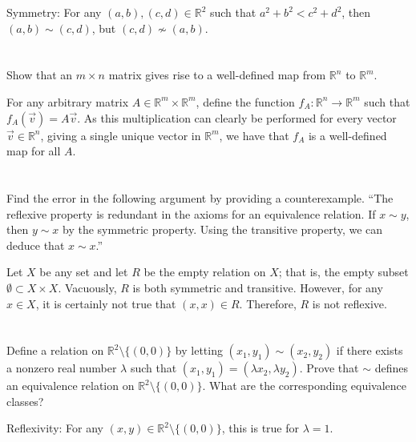 \smallskip

Symmetry: For any $(a, b), (c, d) \in \mathbb{R}^2$ such that $a^2 + b^2 < c^2 + d^2$, then $(a, b) \sim (c, d)$, but $(c, d) \nsim (a, b)$.

\section{}\label{sec:1-27}

Show that an $m \times n$ matrix gives rise to a well-defined map from $\mathbb{R}^n$ to $\mathbb{R}^m$.
\hr

For any arbitrary matrix $A \in \mathbb{R}^m \times \mathbb{R}^m$, define the function $f_A: \mathbb{R}^n \rightarrow \mathbb{R}^m$ such that $f_A(\vec{v}) = A\vec{v}$. As this multiplication can clearly be performed for every vector $\vec{v} \in \mathbb{R}^n$, giving a single unique vector in $\mathbb{R}^m$, we have that $f_A$ is a well-defined map for all $A$.
\pagebreak
\section{}\label{sec:1-28}

Find the error in the following argument by providing a counterexample. ``The reflexive property is redundant in the axioms for an equivalence relation. If $x \sim y$, then $y \sim x$ by the symmetric property. Using the transitive property, we can deduce that $x \sim x$.''
\hr

Let $X$ be any set and let $R$ be the empty relation on $X$; that is, the empty subset $\emptyset \subset X \times X$. Vacuously, $R$ is both symmetric and transitive. However, for any $x \in X$, it is certainly not true that $(x, x) \in R$. Therefore, $R$ is not reflexive.

\section{}\label{sec:1-29}

Define a relation on $\mathbb{R}^2 \setminus \{(0, 0)\}$ by letting $(x_1, y_1) \sim (x_2, y_2)$ if there exists a nonzero real number $\lambda$ such that $(x_1, y_1) = (\lambda x_2, \lambda y_2)$. Prove that $\sim$ defines an equivalence relation on $\mathbb{R}^2 \setminus \{(0, 0)\}$. What are the corresponding equivalence classes?
\hr

Reflexivity: For any $(x, y) \in \mathbb{R}^2 \setminus \{(0, 0)\}$, this is true for $\lambda = 1$.

